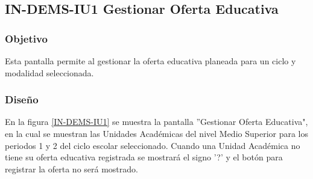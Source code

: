 \subsection{IN-DEMS-IU1 Gestionar Oferta Educativa}

\subsubsection{Objetivo}

Esta pantalla permite al  gestionar la oferta educativa planeada para un ciclo y modalidad seleccionada.

\subsubsection{Diseño}

En la figura \ref{IN-DEMS-IU1} se muestra la pantalla ''Gestionar Oferta Educativa", en la cual se muestran las Unidades Académicas del nivel Medio Superior para los periodos 1 y 2 del ciclo escolar seleccionado. Cuando una Unidad Académica no tiene su oferta educativa registrada se mostrará el signo '?' y el botón para registrar la oferta no será mostrado.

